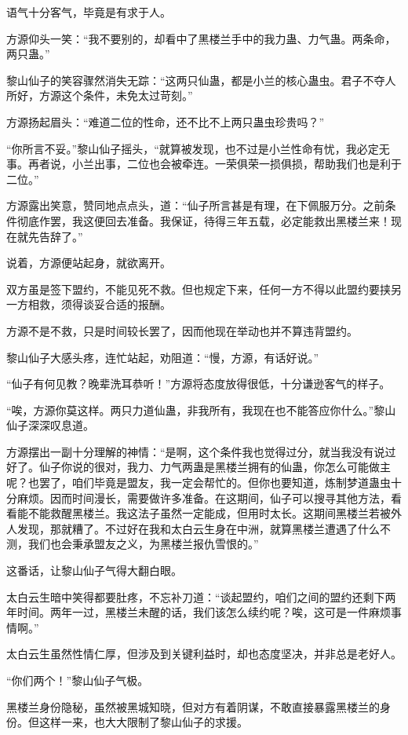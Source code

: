 \begin{this_body}
语气十分客气，毕竟是有求于人。

方源仰头一笑：“我不要别的，却看中了黑楼兰手中的我力蛊、力气蛊。两条命，两只蛊。”

黎山仙子的笑容骤然消失无踪：“这两只仙蛊，都是小兰的核心蛊虫。君子不夺人所好，方源这个条件，未免太过苛刻。”

方源扬起眉头：“难道二位的性命，还不比不上两只蛊虫珍贵吗？”

“你所言不妥。”黎山仙子摇头，“就算被发现，也不过是小兰性命有忧，我必定无事。再者说，小兰出事，二位也会被牵连。一荣俱荣一损俱损，帮助我们也是利于二位。”

方源露出笑意，赞同地点点头，道：“仙子所言甚是有理，在下佩服万分。之前条件彻底作罢，我这便回去准备。我保证，待得三年五载，必定能救出黑楼兰来！现在就先告辞了。”

说着，方源便站起身，就欲离开。

双方虽是签下盟约，不能见死不救。但也规定下来，任何一方不得以此盟约要挟另一方相救，须得谈妥合适的报酬。

方源不是不救，只是时间较长罢了，因而他现在举动也并不算违背盟约。

黎山仙子大感头疼，连忙站起，劝阻道：“慢，方源，有话好说。”

“仙子有何见教？晚辈洗耳恭听！”方源将态度放得很低，十分谦逊客气的样子。

“唉，方源你莫这样。两只力道仙蛊，非我所有，我现在也不能答应你什么。”黎山仙子深深叹息道。

方源摆出一副十分理解的神情：“是啊，这个条件我也觉得过分，就当我没有说过好了。仙子你说的很对，我力、力气两蛊是黑楼兰拥有的仙蛊，你怎么可能做主呢？也罢了，咱们毕竟是盟友，我一定会帮忙的。但你也要知道，炼制梦道蛊虫十分麻烦。因而时间漫长，需要做许多准备。在这期间，仙子可以搜寻其他方法，看看能不能救醒黑楼兰。我这法子虽然一定能成，但用时太长。这期间黑楼兰若被外人发现，那就糟了。不过好在我和太白云生身在中洲，就算黑楼兰遭遇了什么不测，我们也会秉承盟友之义，为黑楼兰报仇雪恨的。”

这番话，让黎山仙子气得大翻白眼。

太白云生暗中笑得都要肚疼，不忘补刀道：“谈起盟约，咱们之间的盟约还剩下两年时间。两年一过，黑楼兰未醒的话，我们该怎么续约呢？唉，这可是一件麻烦事情啊。”

太白云生虽然性情仁厚，但涉及到关键利益时，却也态度坚决，并非总是老好人。

“你们两个！”黎山仙子气极。

黑楼兰身份隐秘，虽然被黑城知晓，但对方有着阴谋，不敢直接暴露黑楼兰的身份。但这样一来，也大大限制了黎山仙子的求援。


\end{this_body}
